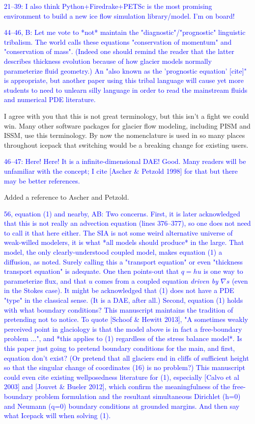 \documentclass{article}
\theoremstyle{definition}
\theoremstyle{plain}
\begin{document}
\textcolor{blue}{21--39:  I also think Python+Firedrake+PETSc is the most promising environment to build a new ice flow simulation library/model.  I'm on board!}

\textcolor{blue}{44--46, B:  Let me vote to *not* maintain the "diagnostic"/"prognostic" linguistic tribalism.  The world calls these equations "conservation of momentum" and "conservation of mass".  (Indeed one should remind the reader that the latter describes thickness evolution because of how glacier models normally parameterize fluid geometry.)  An "also known as the 'prognostic equation' [cite]" is appropriate, but another paper using this tribal language will cause yet more students to need to unlearn silly language in order to read the mainstream fluids and numerical PDE literature.}

I agree with you that this is not great terminology, but this isn't a fight we could win.
Many other software packages for glacier flow modeling, including PISM and ISSM, use this terminology.
By now the nomenclature is used in so many places throughout icepack that switching would be a breaking change for existing users.

\textcolor{blue}{46--47:  Here!  Here!  It is a infinite-dimensional DAE!  Good.  Many readers will be unfamiliar with the concept; I cite [Ascher \& Petzold 1998] for that but there may be better references.}

Added a reference to Ascher and Petzold.

\textcolor{blue}{56, equation (1) and nearby, AB:  Two concerns.  First, it is later acknowledged that this is not really an advection equation (lines 376--377), so one does not need to call it that here either.  The SIA is not some weird alternative universe of weak-willed modelers, it is what *all models should produce* in the large.  That model, the only clearly-understood coupled model, makes equation (1) a diffusion, as noted.  Surely calling this a "transport equation" or even "thickness transport equation" is adequate.  One then points-out that $q=hu$ is one way to parameterize flux, and that $u$ comes from a coupled equation \emph{driven by $\nabla s$} (even in the Stokes case).  It might be acknowledged that (1) does not have a PDE "type" in the classical sense.  (It is a DAE, after all.)  Second, equation (1) holds with what boundary conditions?  This manuscript maintains the tradition of pretending not to notice.  To quote [Schoof \& Hewitt 2013], "A sometimes weakly perceived point in glaciology is that the model above is in fact a free-boundary problem ...", and *this applies to (1) regardless of the stress balance model*.  Is this paper just going to pretend boundary conditions for the main, and first, equation don't exist?  (Or pretend that all glaciers end in cliffs of sufficient height so that the singular change of coordinates (16) is no problem?)  This manuscript could even cite existing wellposedness literature for (1), especially [Calvo et al 2003] and [Jouvet \& Bueler 2012], which confirm the meaningfulness of the free-boundary problem formulation and the resultant simultaneous Dirichlet (h=0) and Neumann (q=0) boundary conditions at grounded margins.  And then say what Icepack will when solving (1).}
\end{document}
